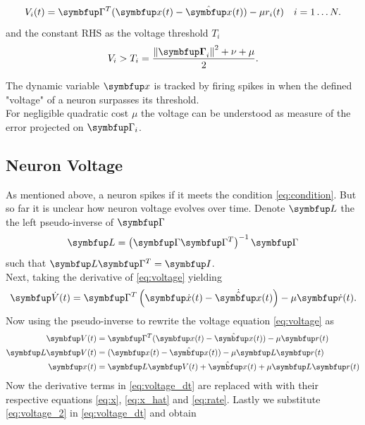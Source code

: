 \begin{equation}\label{eq:voltage}
V_i(t)=\bmu{\Gamma}^T(\bmu{x}(t)-\hat{\bmu{x}}(t))-\mu r_i(t)
\quad i  = 1\dots N.
\end{equation}
and the constant \ac{RHS} as the voltage threshold $T_i$
\begin{equation}\label{eq:condition}
V_i>T_i=\frac{\left\|\boldsymbol{\bmu{\Gamma}}_i\right\|^2 + \nu+\mu}{2}.
\end{equation}

The dynamic variable $\bmu{x}$ is tracked by firing spikes in when the defined "voltage" of a neuron surpasses its threshold.\\
For negligible quadratic cost $\mu$ the voltage can be understood as measure of the error projected on $\bmu{\Gamma}_i$.
\subsection{Neuron Voltage}
As mentioned above, a neuron spikes if it meets the condition \cref{eq:condition}. But so far it is unclear how neuron voltage evolves over time.
Denote $\bmu{L}$ the the left pseudo-inverse of $\bmu{\Gamma}$ \begin{equation}
\bmu{L} = \left(\bmu{\Gamma}\bmu{\Gamma}^T\right)^{-1}\bmu{\Gamma}
\end{equation}
such that $\bmu{L}\bmu{\Gamma}^T = \bmu{I}$.\\
Next, taking the derivative of \cref{eq:voltage} yielding
\begin{equation}\label{eq:voltage_dt}
\bmu{\dot{V}}(t)=\bmu{\Gamma}^T\left(\bmu{\dot{x}}(t)-\dot{\hat{\bmu{x}}}(t)\right)-\mu \bmu{\dot{r}}(t).
\end{equation}
Now using the pseudo-inverse to rewrite the voltage equation \cref{eq:voltage} as
\begin{equation}\label{eq:voltage_2}
\begin{aligned}
\bmu{V}(t)&=\bmu{\Gamma}^T(\bmu{x}(t)-\hat{\bmu{x}}(t))-\mu \bmu{r}(t)\\
\bmu{L}\bmu{V}(t)&=(\bmu{x}(t)-\hat{\bmu{x}}(t))-\mu \bmu{L}\bmu{r}(t)\\
\bmu{x}(t)&=\bmu{L}\bmu{V}(t)  + \hat{\bmu{x}}(t) + \mu \bmu{L}\bmu{r}(t)\\
\end{aligned}
\end{equation}
Now the derivative terms in \cref{eq:voltage_dt} are replaced with  with their respective equations \cref{eq:x}, \cref{eq:x_hat} and \cref{eq:rate}. Lastly we substitute \cref{eq:voltage_2} in \cref{eq:voltage_dt} and obtain

